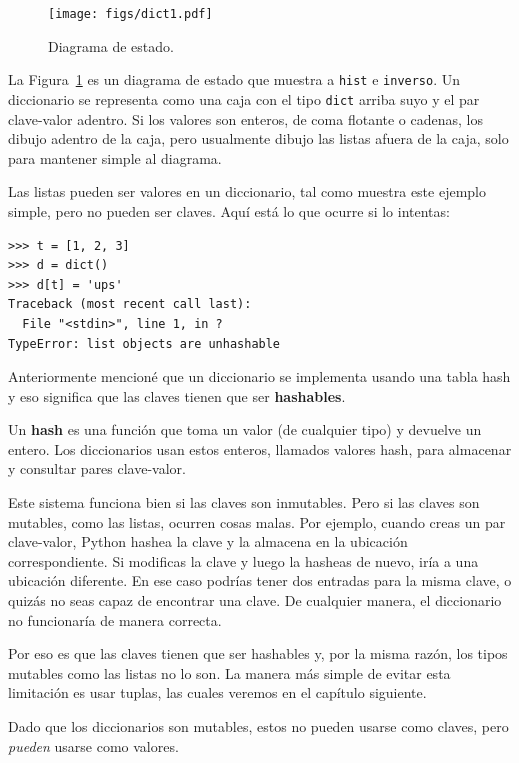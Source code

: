 \documentclass[10pt]{book}
\begin{document}
\begin{figure}
\centerline
{\texttt{[image: figs/dict1.pdf]}}
\caption{Diagrama de estado.}
\label{fig.dict1}
\end{figure}

La Figura~\ref{fig.dict1} es un diagrama de estado que muestra a {\tt hist} e {\tt inverso}.
Un diccionario se representa como una caja con el tipo {\tt dict} arriba suyo
y el par clave-valor adentro.  Si los valores son enteros, de coma flotante o
cadenas, los dibujo adentro de la caja, pero usualmente dibujo las listas
afuera de la caja, solo para mantener simple al diagrama.

Las listas pueden ser valores en un diccionario, tal como muestra este ejemplo simple, pero
no pueden ser claves.  Aquí está lo que ocurre si lo intentas:


\begin{verbatim}
>>> t = [1, 2, 3]
>>> d = dict()
>>> d[t] = 'ups'
Traceback (most recent call last):
  File "<stdin>", line 1, in ?
TypeError: list objects are unhashable
\end{verbatim}
%
Anteriormente mencioné que un diccionario se implementa usando
una tabla hash y eso significa que las claves tienen que ser {\bf hashables}.

Un {\bf hash} es una función que toma un valor (de cualquier tipo)
y devuelve un entero.  Los diccionarios usan estos enteros,
llamados valores hash, para almacenar y consultar pares clave-valor.

Este sistema funciona bien si las claves son inmutables.  Pero si las
claves son mutables, como las listas, ocurren cosas malas.  Por ejemplo,
cuando creas un par clave-valor, Python hashea la clave y
la almacena en la ubicación correspondiente.  Si modificas la
clave y luego la hasheas de nuevo, iría a una ubicación diferente.
En ese caso podrías tener dos entradas para la misma clave,
o quizás no seas capaz de encontrar una clave.  De cualquier manera, el
diccionario no funcionaría de manera correcta.

Por eso es que las claves tienen que ser hashables y, por la misma razón, los tipos mutables como
las listas no lo son.  La manera más simple de evitar esta limitación es
usar tuplas, las cuales veremos en el capítulo siguiente.

Dado que los diccionarios son mutables, estos no pueden usarse como claves,
pero {\em pueden} usarse como valores.
\end{document}
